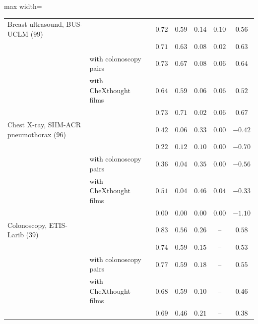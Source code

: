 \begin{table}[!htbp]
\begin{adjustbox}{max width=\linewidth}
\begin{tabular}{ll c ccccc}
Breast ultrasound, BUS-UCLM ($99$) & \msn{} & & $0.72$ & $0.59$ & $0.14$ & $0.10$ & $0.56$ \\
 & \msp{} & & $0.71$ & $0.63$ & $0.08$ & $0.02$ & $0.63$ \\
 & \msp{} with colonoscopy pairs & & $0.73$ & $0.67$ & $0.08$ & $0.06$ & $0.64$ \\
 & \msp{} with CheXthought films & & $0.64$ & $0.59$ & $0.06$ & $0.06$ & $0.52$ \\
 & \ms{} & & $0.73$ & $0.71$ & $0.02$ & $0.06$ & $0.67$ \\
Chest X-ray, SIIM-ACR pneumothorax ($96$) & \msn{} & & $0.42$ & $0.06$ & $0.33$ & $0.00$ & $-0.42$ \\
 & \msp{} & & $0.22$ & $0.12$ & $0.10$ & $0.00$ & $-0.70$ \\
 & \msp{} with colonoscopy pairs & & $0.36$ & $0.04$ & $0.35$ & $0.00$ & $-0.56$ \\
 & \msp{} with CheXthought films & & $0.51$ & $0.04$ & $0.46$ & $0.04$ & $-0.33$ \\
 & \ms{} & & $0.00$ & $0.00$ & $0.00$ & $0.00$ & $-1.10$ \\
Colonoscopy, ETIS-Larib ($39$) & \msn{} & & $0.83$ & $0.56$ & $0.26$ & -- & $0.58$ \\
 & \msp{} & & $0.74$ & $0.59$ & $0.15$ & -- & $0.53$ \\
 & \msp{} with colonoscopy pairs & & $0.77$ & $0.59$ & $0.18$ & -- & $0.55$ \\
 & \msp{} with CheXthought films & & $0.68$ & $0.59$ & $0.10$ & -- & $0.46$ \\
 & \ms{} & & $0.69$ & $0.46$ & $0.21$ & -- & $0.38$ \\
\bottomrule
\end{tabular}
\end{adjustbox}
\end{table}

